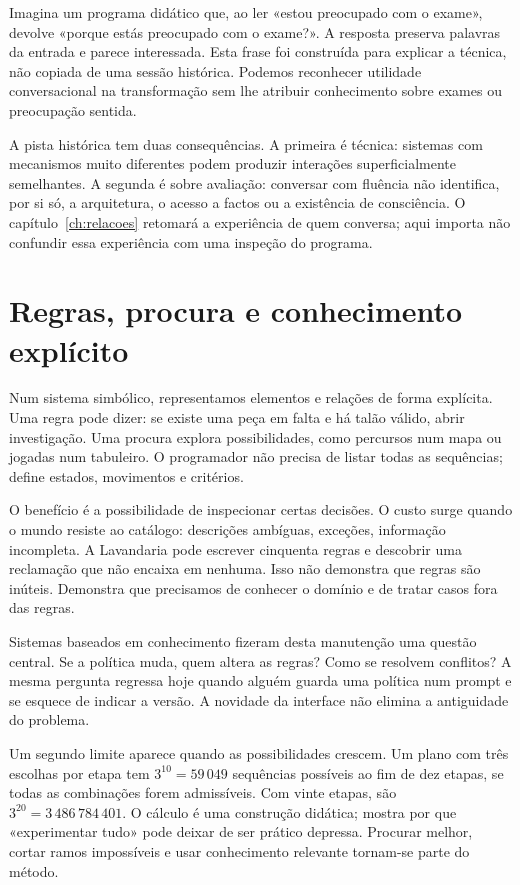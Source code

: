 Imagina um programa didático que, ao ler «estou preocupado com o exame», devolve «porque estás preocupado com o exame?». A resposta preserva palavras da entrada e parece interessada. Esta frase foi construída para explicar a técnica, não copiada de uma sessão histórica. Podemos reconhecer utilidade conversacional na transformação sem lhe atribuir conhecimento sobre exames ou preocupação sentida.

A pista histórica tem duas consequências. A primeira é técnica: sistemas com mecanismos muito diferentes podem produzir interações superficialmente semelhantes. A segunda é sobre avaliação: conversar com fluência não identifica, por si só, a arquitetura, o acesso a factos ou a existência de consciência. O capítulo~\ref{ch:relacoes} retomará a experiência de quem conversa; aqui importa não confundir essa experiência com uma inspeção do programa.

\section{Regras, procura e conhecimento explícito}
Num sistema simbólico, representamos elementos e relações de forma explícita. Uma regra pode dizer: se existe uma peça em falta e há talão válido, abrir investigação. Uma procura explora possibilidades, como percursos num mapa ou jogadas num tabuleiro. O programador não precisa de listar todas as sequências; define estados, movimentos e critérios.

O benefício é a possibilidade de inspecionar certas decisões. O custo surge quando o mundo resiste ao catálogo: descrições ambíguas, exceções, informação incompleta. A Lavandaria pode escrever cinquenta regras e descobrir uma reclamação que não encaixa em nenhuma. Isso não demonstra que regras são inúteis. Demonstra que precisamos de conhecer o domínio e de tratar casos fora das regras.

Sistemas baseados em conhecimento fizeram desta manutenção uma questão central. Se a política muda, quem altera as regras? Como se resolvem conflitos? A mesma pergunta regressa hoje quando alguém guarda uma política num prompt e se esquece de indicar a versão. A novidade da interface não elimina a antiguidade do problema.

Um segundo limite aparece quando as possibilidades crescem. Um plano com três escolhas por etapa tem $3^{10}=59\,049$ sequências possíveis ao fim de dez etapas, se todas as combinações forem admissíveis. Com vinte etapas, são $3^{20}=3\,486\,784\,401$. O cálculo é uma construção didática; mostra por que «experimentar tudo» pode deixar de ser prático depressa. Procurar melhor, cortar ramos impossíveis e usar conhecimento relevante tornam-se parte do método.

